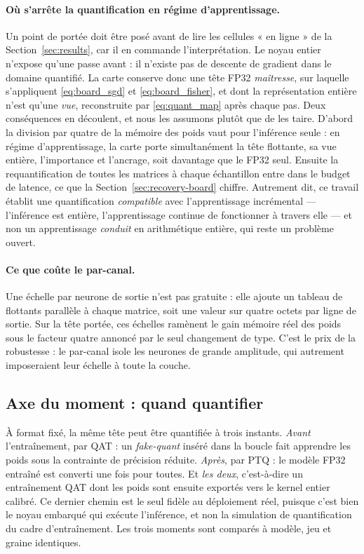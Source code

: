 \paragraph{Où s'arrête la quantification en régime d'apprentissage.} Un point de portée doit être posé
avant de lire les cellules « en ligne » de la Section~\ref{sec:results}, car il en commande
l'interprétation. Le noyau entier n'expose qu'une passe avant : il n'existe pas de descente de gradient
dans le domaine quantifié. La carte conserve donc une tête FP32 \emph{maîtresse}, sur laquelle
s'appliquent \eqref{eq:board_sgd} et \eqref{eq:board_fisher}, et dont la représentation entière n'est
qu'une \emph{vue}, reconstruite par \eqref{eq:quant_map} après chaque pas. Deux conséquences en découlent,
et nous les assumons plutôt que de les taire. D'abord la division par quatre de la mémoire des poids vaut
pour l'inférence seule : en régime d'apprentissage, la carte porte simultanément la tête flottante, sa vue
entière, l'importance et l'ancrage, soit davantage que le FP32 seul. Ensuite la requantification de toutes
les matrices à chaque échantillon entre dans le budget de latence, ce que la
Section~\ref{sec:recovery-board} chiffre. Autrement dit, ce travail établit une quantification
\emph{compatible} avec l'apprentissage incrémental --- l'inférence est entière, l'apprentissage continue
de fonctionner à travers elle --- et non un apprentissage \emph{conduit} en arithmétique entière, qui reste
un problème ouvert.

\paragraph{Ce que coûte le par-canal.} Une échelle par neurone de sortie n'est pas gratuite : elle
ajoute un tableau de flottants parallèle à chaque matrice, soit une valeur sur quatre octets par ligne
de sortie. Sur la tête portée, ces échelles ramènent le gain mémoire réel des poids sous le facteur
quatre annoncé par le seul changement de type. C'est le prix de la robustesse : le par-canal isole les
neurones de grande amplitude, qui autrement imposeraient leur échelle à toute la couche.

\subsection{Axe du moment : quand quantifier}

À format fixé, la même tête peut être quantifiée à trois instants. \emph{Avant} l'entraînement, par QAT :
un \emph{fake-quant} inséré dans la boucle fait apprendre les poids sous la contrainte de précision
réduite. \emph{Après}, par PTQ : le modèle FP32 entraîné est converti une fois pour toutes. Et \emph{les
deux}, c'est-à-dire un entraînement QAT dont les poids sont ensuite exportés vers le kernel entier
calibré. Ce dernier chemin est le seul fidèle au déploiement réel, puisque c'est bien le noyau embarqué
qui exécute l'inférence, et non la simulation de quantification du cadre d'entraînement. Les trois
moments sont comparés à modèle, jeu et graine identiques.

